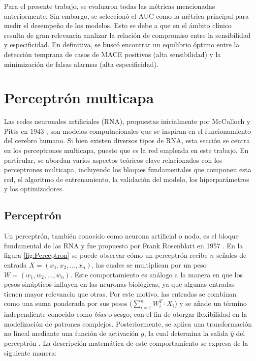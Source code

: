 Para el presente trabajo, se evaluaron todas las métricas mencionadas anteriormente. Sin embargo, se seleccionó 
el AUC como la métrica principal para medir el desempeño de los modelos. Esto se debe a que en el ámbito clínico 
resulta de gran relevancia analizar la relación de compromiso entre la sensibilidad y especificidad. En definitiva, 
se buscó encontrar un equilibrio óptimo entre la detección temprana de casos de MACE positivos (alta sensibilidad) 
y la minimización de falsas alarmas (alta especificidad). 


\section{Perceptrón multicapa}
\label{sec:Perceptrón multicapa}

Las redes neuronales artificiales (RNA), propuestas inicialmente por McCulloch y Pitts en 1943 
\citep{CITE:41}, son modelos computacionales que se inspiran en el funcionamiento del cerebro 
humano. Si bien existen diversos tipos de RNA, esta sección se centra en los perceptrones 
multicapa, puesto que es la red empleada en este trabajo. En particular, se abordan varios 
aspectos teóricos clave relacionados con los perceptrones multicapa, incluyendo los bloques 
fundamentales que componen esta red, el algoritmo de entrenamiento, la validación del modelo, 
los hiperparámetros y los optimizadores.

\subsection{Perceptrón}
Un perceptrón, también conocido como neurona artificial o nodo, es el bloque fundamental de las 
RNA y fue propuesto por Frank Rosenblatt en 1957 \citep{CITE:43}. En la figura \ref{fig:Perceptron} se puede observar 
cómo un perceptrón recibe $n$ señales de entrada $X = (x_1, x_2, …, x_n)$, las cuales se multiplican 
por un peso $W = (w_1, w_2, …, w_n)$. Este comportamiento es análogo a la manera en que los 
pesos sinápticos influyen en las neuronas biológicas, ya que algunas entradas tienen mayor relevancia 
que otras. Por este motivo, las entradas se combinan como una suma ponderada por sus pesos 
($\sum_{i=1}^{n} W_i^T \cdot X_i$) y se añade un término independiente conocido como \emph{bias} o 
sesgo, con el fin de otorgar flexibilidad en la modelización de patrones complejos. 
Posteriormente, se aplica una transformación no lineal mediante una función de activación $g$, 
la cual determina la salida $\hat{y} $ del perceptrón \citep{CITE:35} \citep{CITE:42}. 
La descripción matemática de este comportamiento se expresa de la siguiente manera: 

